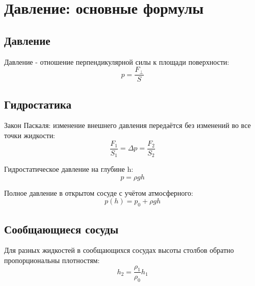 \documentclass{article}
\begin{document}
\section*{Давление: основные формулы}

\subsection*{Давление}
Давление - отношение перпендикулярной силы к площади поверхности:
\[p = \frac{F_\perp}{S}\]

\subsection*{Гидростатика}
Закон Паскаля: изменение внешнего давления передаётся без изменений во все точки жидкости:
\[\frac{F_1}{S_1} = \Delta p = \frac{F_2}{S_2}\]

Гидростатическое давление на глубине h:
\[p = \rho g h\]

Полное давление в открытом сосуде с учётом атмосферного:
\[p(h) = p_0 + \rho gh\]

\subsection*{Сообщающиеся сосуды}
Для разных жидкостей в сообщающихся сосудах высоты столбов обратно пропорциональны плотностям:
\[h_2 = \frac{\rho_1}{\rho_0}h_1\]
\end{document}

